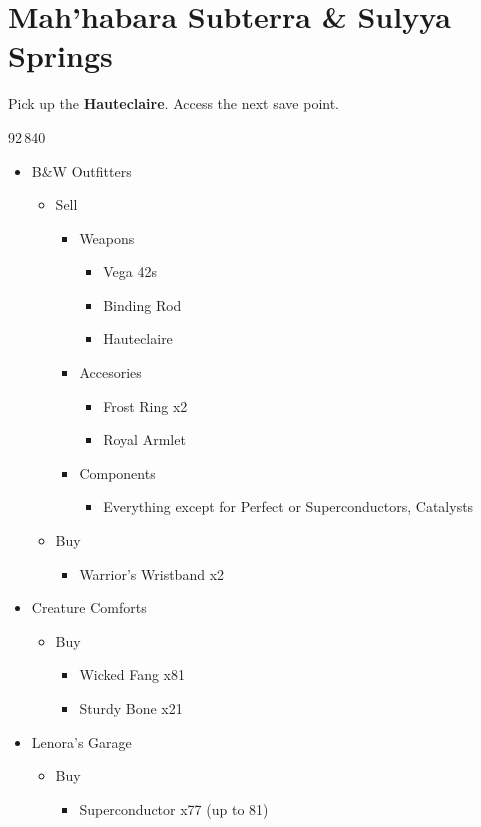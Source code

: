 \chapter{Mah'habara Subterra \& Sulyya Springs}

Pick up the \textbf{Hauteclaire}.
Access the next save point.

\begin{shop}{92\,840}
	\begin{itemize}
		\item B\&W Outfitters
			\begin{itemize}
				\item Sell
					\begin{itemize}
						\item Weapons
							\begin{itemize}
								\item Vega 42s
								\item Binding Rod
								\item Hauteclaire
							\end{itemize}
						\item Accesories
							\begin{itemize}
								\item Frost Ring x2
								\item Royal Armlet
							\end{itemize}
						\item Components
							\begin{itemize}
								\item Everything except for Perfect or Superconductors, Catalysts
							\end{itemize}
					\end{itemize}
				\item Buy
					\begin{itemize}
						\item Warrior's Wristband x2
					\end{itemize}
			\end{itemize}
		\item Creature Comforts
			\begin{itemize}
				\item Buy
					\begin{itemize}
						\item Wicked Fang x81
						\item Sturdy Bone x21
					\end{itemize}
			\end{itemize}
		\item Lenora's Garage
			\begin{itemize}
				\item Buy
					\begin{itemize}
						\item Superconductor x77 (up to 81)
					\end{itemize}
			\end{itemize}		
	\end{itemize}
\end{shop}

